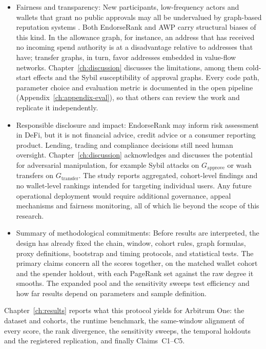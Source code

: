 \begin{itemize}
\item{}\label{sub:fairness-transparency}
  Fairness and transparency: New participants, low-frequency actors and wallets that grant no public approvals may all be undervalued by graph-based reputation systems . Both EndorseRank and AWP carry structural biases of this kind. In the allowance graph, for instance, an address that has received no incoming spend authority is at a disadvantage relative to addresses that have; transfer graphs, in turn, favor addresses embedded in value-flow networks. Chapter~\ref{ch:discussion} discusses the limitations, among them cold-start effects and the Sybil susceptibility of approval graphs. Every code path, parameter choice and evaluation metric is documented in the open pipeline (Appendix~\ref{ch:appendix-eval}), so that others can review the work and replicate it independently.


\item{}\label{sub:responsible-disclosure}
  Responsible disclosure and impact: EndorseRank may inform risk assessment in DeFi, but it is not financial advice, credit advice or a consumer reporting product. Lending, trading and compliance decisions still need human oversight. Chapter~\ref{ch:discussion} acknowledges and discusses the potential for adversarial manipulation, for example Sybil attacks on $G_{\text{approve}}$ or wash transfers on $G_{\text{transfer}}$. The study reports aggregated, cohort-level findings and no wallet-level rankings intended for targeting individual users. Any future operational deployment would require additional governance, appeal mechanisms and fairness monitoring, all of which lie beyond the scope of this research.


\item{}\label{sub:methodological-commitments}
  Summary of methodological commitments: Before results are interpreted, the design has already fixed the chain, window, cohort rules, graph formulas, proxy definitions, bootstrap and timing protocols, and statistical tests. The primary claims concern all the scores together, on the matched wallet cohort and the spender holdout, with each PageRank set against the raw degree it smooths. The expanded pool and the sensitivity sweeps test efficiency and how far results depend on parameters and sample definition.
\end{itemize}

Chapter~\ref{ch:results} reports what this protocol yields for Arbitrum One: the dataset and cohorts, the runtime benchmark, the same-window alignment of every score, the rank divergence, the sensitivity sweeps, the temporal holdouts and the registered replication, and finally Claims~C1--C5.
